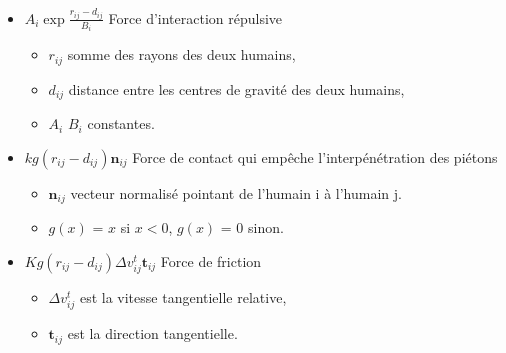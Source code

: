 \begin{itemize}[leftmargin=1cm, label=, itemsep=0pt]%
\item  $A_i \exp{\frac{r_{ij}-d_{ij}}{B_i}}$ Force d'interaction répulsive
\begin{itemize}[leftmargin=1cm, label=, itemsep=0pt]%
\item  $r_{ij}$ somme des rayons des deux humains,
\item  $d_{ij}$ distance entre les centres de gravité des deux humains,
\item  $A_i$ $B_i$ constantes.
\end{itemize}
\item  $kg(r_{ij}-d_{ij})\mathbf{n}_{ij}$ Force de contact qui empêche l'interpénétration des piétons
\begin{itemize}[leftmargin=1cm, label=, itemsep=0pt]%
\item  $\mathbf{n}_{ij}$ vecteur normalisé pointant de l'humain i à l'humain j.
\item  $g(x)$ = $x$ si $x < 0$, $g(x)$ = $0$ sinon.
\end{itemize}
\item  $Kg(r_{ij}-d_{ij})\Delta v^t_{ij}\mathbf{t}_{ij}$ Force de friction
\begin{itemize}[leftmargin=1cm, label=, itemsep=0pt]%
\item  $\Delta v^t_{ij}$ est la vitesse tangentielle relative,
\item  $\mathbf{t}_{ij}$ est la direction tangentielle.
\end{itemize}
\end{itemize}
%

